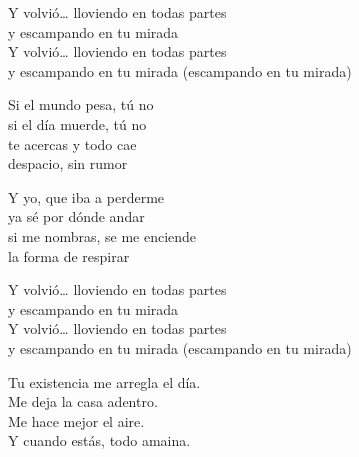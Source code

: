 \begin{lyrics}
Y volvió… lloviendo en todas partes\\
y escampando en tu mirada\\
Y volvió… lloviendo en todas partes\\
y escampando en tu mirada
(escampando en tu mirada)

Si el mundo pesa, tú no\\
si el día muerde, tú no\\
te acercas y todo cae\\
despacio, sin rumor

Y yo, que iba a perderme\\
ya sé por dónde andar\\
si me nombras, se me enciende\\
la forma de respirar

Y volvió… lloviendo en todas partes\\
y escampando en tu mirada\\
Y volvió… lloviendo en todas partes\\
y escampando en tu mirada
(escampando en tu mirada)

Tu existencia me arregla el día.\\
Me deja la casa adentro.\\
Me hace mejor el aire.\\
Y cuando estás, todo amaina.
\end{lyrics}

